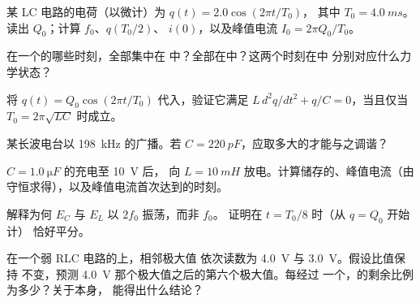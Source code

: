 \begin{exercise}[$\star$]\label{exo:g12:rlc-oscillations:4}
某 LC 电路的电荷（以微计）为 $q(t) = 2.0\cos(2\pi t/T_0)$，
其中 $T_0 = \qty{4.0}{ms}$。读出 $Q_0$；计算 $f_0$、$q(T_0/2)$、
$i(0)$，以及峰值电流 $I_0 = 2\pi Q_0/T_0$。
\end{exercise}

\begin{exercise}[$\star$]\label{exo:g12:rlc-oscillations:5}
在一个的哪些时刻，全部集中在
中？全部在中？这两个时刻在中
分别对应什么力学状态？
\end{exercise}

\begin{exercise}[$\star\star$]\label{exo:g12:rlc-oscillations:6}
将 $q(t) = Q_0\cos(2\pi t/T_0)$ 代入，验证它满足
$L\,d^2q/dt^2 + q/C = 0$，当且仅当 $T_0 = 2\pi\sqrt{LC}$ 时成立。
\end{exercise}

\begin{exercise}[$\star\star$]\label{exo:g12:rlc-oscillations:7}
某长波电台以 \qty{198}{kHz} 的广播。若
$C = \qty{220}{pF}$，应取多大的才能与之调谐？
\end{exercise}

\begin{exercise}[$\star\star$]\label{exo:g12:rlc-oscillations:8}
$C = \qty{1.0}{\micro F}$ 的充电至 \qty{10}{V} 后，
向 $L = \qty{10}{mH}$ 放电。计算储存的、峰值电流（由
守恒求得），以及峰值电流首次达到的时刻。
\end{exercise}

\begin{exercise}[$\star\star$]\label{exo:g12:rlc-oscillations:9}
解释为何 $E_C$ 与 $E_L$ 以 $2f_0$ 振荡，而非 $f_0$。
证明在 $t = T_0/8$ 时（从 $q = Q_0$ 开始计）
恰好平分。
\end{exercise}

\begin{exercise}[$\star\star$]\label{exo:g12:rlc-oscillations:10}
在一个弱 RLC 电路的上，相邻极大值
依次读数为 \qty{4.0}{V} 与 \qty{3.0}{V}。假设比值保持
不变，预测 \qty{4.0}{V} 那个极大值之后的第六个极大值。每经过
一个，\emph{}的剩余比例为多少？关于本身，
能得出什么结论？
\end{exercise}

